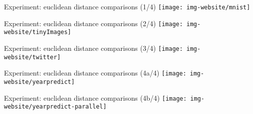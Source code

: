 \begin{frame}{Experiment: euclidean distance comparisons (1/4)}
\vspace{-0.25in}
\texttt{[image: img-website/mnist]}
\end{frame}

\begin{frame}{Experiment: euclidean distance comparisons (2/4)}
\vspace{-0.25in}
\texttt{[image: img-website/tinyImages]}
\end{frame}

\begin{frame}{Experiment: euclidean distance comparisons (3/4)}
\vspace{-0.25in}
\texttt{[image: img-website/twitter]}
\end{frame}

\begin{frame}{Experiment: euclidean distance comparisons (4a/4)}
\vspace{-0.25in}
\texttt{[image: img-website/yearpredict]}
\end{frame}

\begin{frame}{Experiment: euclidean distance comparisons (4b/4)}
\vspace{-0.25in}
\texttt{[image: img-website/yearpredict-parallel]}
\end{frame}

